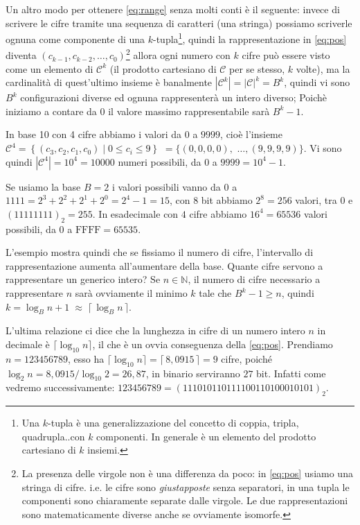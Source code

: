 Un altro modo  per
ottenere \eqref{eq:range} senza molti conti è il seguente: invece di scrivere
le cifre tramite una sequenza di caratteri (una stringa) possiamo scriverle
ognuna come componente di una $k$-tupla\footnote{Una $k$-tupla è una
generalizzazione del concetto di coppia, tripla, quadrupla..con $k$ componenti.
In generale è un elemento del prodotto cartesiano di $k$ insiemi.}, quindi la
rappresentazione in \eqref{eq:pos} diventa $(c_{k-1}, c_{k-2}, \ldots,
c_0)$\footnote{La presenza delle virgole non è una differenza da poco: in
\eqref{eq:pos} usiamo una stringa di cifre. i.e. le cifre sono
\emph{giustapposte} senza separatori, in una tupla le componenti sono
chiaramente separate dalle virgole. Le due rappresentazioni sono
matematicamente diverse anche se ovviamente isomorfe.} allora ogni numero con
$k$ cifre può essere visto come un elemento di $\mathcal{C}^k$ (il prodotto
cartesiano di $\mathcal{C}$ per se stesso, $k$ volte), ma la cardinalità di
quest'ultimo insieme è banalmente $|\mathcal{C}^k| = |\mathcal{C}|^k = B^k$,
quindi vi sono $B^k$ configurazioni diverse ed ognuna rappresenterà un intero
diverso; Poichè iniziamo a contare da $0$ il valore massimo rappresentabile
sarà $B^k-1$.

\begin{ex} In base 10 con 4 cifre abbiamo i valori da $0$ a $9999$, cioè
l'insieme $\mathcal{C}^4 = \left\{ (c_3,c_2,c_1,c_0) \;|\; 0 \leq c_i \leq 9
\right\}$ $= \{ (0,0,0,0),$ $\ldots, (9,9,9,9) \}$. Vi sono quindi
$|\mathcal{C}^4| = 10^4 = 10000$ numeri possibili, da $0$ a $9999 =
10^4-1$.\medskip

Se usiamo la base $B = 2$ i valori possibili vanno da $0$ a $1111 =
2^3+2^2+2^1+2^0 = 2^4-1 = 15$, con $8$ bit abbiamo $2^8 = 256$ valori, tra $0$
e $(11111111)_2 = 255$. In esadecimale con $4$ cifre abbiamo $16^4 = 65536$ valori possibili, da $0$ a $\text{FFFF} = 65535$.
\end{ex}

L'esempio
mostra quindi che se fissiamo il numero di cifre, l'intervallo di
rappresentazione aumenta all'aumentare della base. Quante cifre servono a
rappresentare un generico intero? Se $n \in \mathbb{N}$, il numero di cifre
necessario a rappresentare $n$ sarà ovviamente il minimo $k$ tale che $B^k-1
\geq n$, quindi $k = \log_B{n+1} \;\approx\; \lceil\, \log_B{n} \,\rceil$.

\begin{ex} L'ultima relazione ci dice
che la lunghezza in cifre di un numero intero $n$ in decimale è
$\lceil\log_{10} n \rceil$, il che è un ovvia conseguenza della \eqref{eq:pos}.
Prendiamo $n = 123456789$, esso ha $\lceil \log_{10} n \rceil = \lceil\, 8,0915
\,\rceil = 9$ cifre, poiché $\log_2{n} = 8,0915 / \log_{10}{2} = 26,87$, in
binario serviranno $27$ bit. Infatti come vedremo successivamente: $123456789 =
(111010110111100110100010101)_2$. \end{ex}


